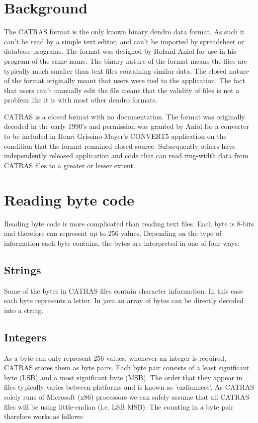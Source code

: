 \section{Background}
The CATRAS format \citep{catras} is the only known binary dendro data format. As such it can't be read by a simple text editor, and can't be imported by spreadsheet or database programs. The format was designed by Roland Aniol for use in his program of the same name. The binary nature of the format means the files are typically much smaller than text files containing similar data. The closed nature of the format originally meant that users were tied to the application.  The fact that users can't manually edit the file means that the validity of files is not a problem like it is with most other dendro formats.

CATRAS is a closed format with no documentation. The format was originally decoded in the early 1990's and permission was granted by Aniol for a converter to be included in Henri Grissino-Mayer's CONVERT5 application on the condition that the format remained closed source. Subsequently others have independently released application and code that can read ring-width data from CATRAS files to a greater or lesser extent.

\section{Reading byte code}

Reading byte code is more complicated than reading text files. Each byte is 8-bits and therefore can represent up to 256 values. Depending on the type of information each byte contains, the bytes are interpreted in one of four ways: 

\subsection{Strings} Some of the bytes in CATRAS files contain character information. In this case each byte represents a letter. In java an array of bytes can be directly decoded into a string. 

\subsection{Integers} As a byte can only represent 256 values, whenever an integer is required, CATRAS stores them as byte pairs. Each byte pair consists of a least significant byte (LSB) and a most significant byte (MSB). The order that they appear in files typically varies between platforms and is known as 'endianness'. As CATRAS solely runs of Microsoft (x86) processors we can safely assume that all CATRAS files will be using little-endian (i.e. LSB MSB). The counting in a byte pair therefore works as follows: 

